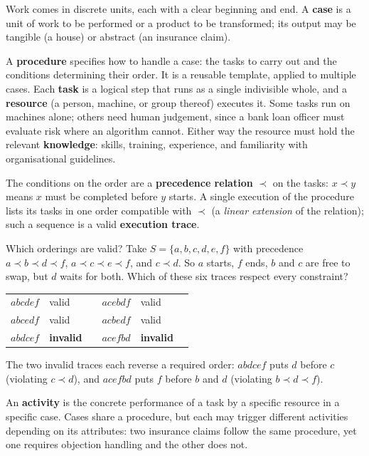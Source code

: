 Work comes in discrete units, each with a clear beginning and end. A \textbf{case} is a unit of work to be performed or a product to be transformed; its output may be tangible (a house) or abstract (an insurance claim).

A \textbf{procedure} specifies how to handle a case: the tasks to carry out and the conditions determining their order. It is a reusable template, applied to multiple cases. Each \textbf{task} is a logical step that runs as a single indivisible whole, and a \textbf{resource} (a person, machine, or group thereof) executes it. Some tasks run on machines alone; others need human judgement, since a bank loan officer must evaluate risk where an algorithm cannot. Either way the resource must hold the relevant \textbf{knowledge}: skills, training, experience, and familiarity with organisational guidelines.

The conditions on the order are a \textbf{precedence relation} $\prec$ on the tasks: $x \prec y$ means $x$ must be completed before $y$ starts. A single execution of the procedure lists its tasks in one order compatible with $\prec$ (a \emph{linear extension} of the relation); such a sequence is a valid \textbf{execution trace}.

\begin{examplebox}{Which orderings are valid?}
  Take $S = \{a,b,c,d,e,f\}$ with precedence $a \prec b \prec d \prec f$, $a \prec c \prec e \prec f$, and $c \prec d$. So $a$ starts, $f$ ends, $b$ and $c$ are free to swap, but $d$ waits for both. Which of these six traces respect every constraint?
  \begin{center}
    \begin{tabular}{lll@{\qquad}lll}
      $abcdef$ & valid   & & $acebdf$ & valid \\
      $abcedf$ & valid   & & $acbedf$ & valid \\
      $abdcef$ & \textbf{invalid} & & $acefbd$ & \textbf{invalid} \\
    \end{tabular}
  \end{center}
  The two invalid traces each reverse a required order: $abdcef$ puts $d$ before $c$ (violating $c \prec d$), and $acefbd$ puts $f$ before $b$ and $d$ (violating $b \prec d \prec f$).
\end{examplebox}

An \textbf{activity} is the concrete performance of a task by a specific resource in a specific case. Cases share a procedure, but each may trigger different activities depending on its attributes: two insurance claims follow the same procedure, yet one requires objection handling and the other does not.

